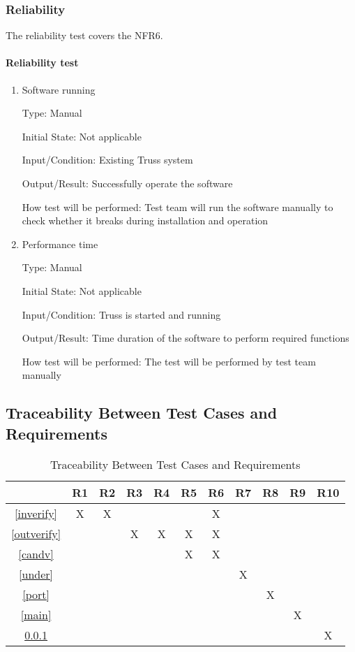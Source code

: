 \documentclass[12pt, titlepage]{article}
\begin{document}
\subsubsection{Reliability} \label{reliab}
The reliability test covers the NFR6.
\paragraph{Reliability test}

\begin{enumerate}
	
	\item{Software running\\}
	
	Type: Manual
	
	Initial State: Not applicable
	
	Input/Condition: Existing Truss system
	
	Output/Result: Successfully operate the software
	
	How test will be performed: Test team will run the software manually to 
	check whether it breaks during installation and operation
	
	\item{Performance time\\}
	
	Type: Manual
	
	Initial State: Not applicable
	
	Input/Condition: Truss is started and running
	
	Output/Result: Time duration of the software to perform required functions
	
	How test will be performed: The test will be performed by test team manually
	
\end{enumerate}

\subsection{Traceability Between Test Cases and Requirements}

\begin{table}[h!]
	\centering
	\begin{tabular}{|c|c|c|c|c|c|c|c|c|c|c|}
		\hline
		& R1 & R2 & R3 & R4 & R5 & R6 & R7 & R8 & R9 & R10\\
		\hline
		\ref{inverify}    &X &X & & & &X & & & &\\ \hline
		\ref{outverify}   & & &X &X &X &X & & & &\\ \hline
		\ref{candv}       & & & & &X &X & & & &\\ \hline
		\ref{under}       & & & & & & &X & & &\\ \hline
		\ref{port}        & & & & & & & &X & &\\ \hline
		\ref{main}        & & & & & & & & &X &\\ \hline
		\ref{reliab}      & & & & & & & & & &X\\ \hline
	\end{tabular}
	\caption{Traceability Between Test Cases and Requirements}
	\label{Table:A_trace}
\end{table}
\end{document}
